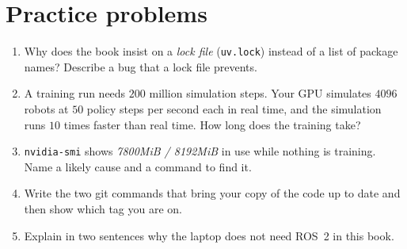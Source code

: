 \section*{Practice problems}
\begin{enumerate}[label=\textbf{\thechapter.\arabic*}]
  \item Why does the book insist on a \emph{lock file} (\texttt{uv.lock}) instead of a list of package names? Describe a bug that a lock file prevents.
  \item A training run needs $200$ million simulation steps. Your GPU simulates $4096$ robots at $50$ policy steps per second each in real time, and the simulation runs $10$ times faster than real time. How long does the training take?
  \item \verb!nvidia-smi! shows \emph{7800MiB / 8192MiB} in use while nothing is training. Name a likely cause and a command to find it.
  \item Write the two git commands that bring your copy of the code up to date and then show which tag you are on.
  \item Explain in two sentences why the laptop does not need ROS~2 in this book.
\end{enumerate}
